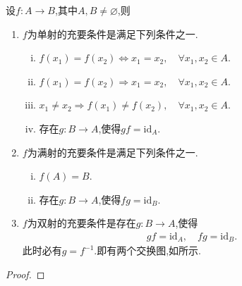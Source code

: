 \documentclass[../../main.tex]{subfiles}%
\begin{document}
\begin{theorem}
设$f:A\to B$,其中$A,B\neq \varnothing$,则
\begin{enumerate}[(1)]
\item $f$为单射的充要条件是满足下列条件之一.
\begin{enumerate}[(i)]
\item $f(x_1)=f(x_2)\iff x_1=x_2,\quad \forall x_1,x_2\in A.$

\item $f(x_1)=f(x_2)\Longrightarrow x_1=x_2,\quad \forall x_1,x_2\in A.$

\item $x_1\ne x_2\Longrightarrow f(x_1)\ne f(x_2),\quad \forall x_1,x_2\in A.$

\item 存在$g:B\to A$,使得$gf=\text{id}_A.$
\end{enumerate}

\item $f$为满射的充要条件是满足下列条件之一.
\begin{enumerate}[(i)]
\item $f(A)=B.$

\item 存在$g:B\to A$,使得$fg=\text{id}_B.$
\end{enumerate}

\item $f$为双射的充要条件是存在$g:B\to A$,使得
\begin{align*}
gf=\text{id}_A,\quad fg=\text{id}_B.
\end{align*}
此时必有$g=f^{-1}$.即有两个交换图,如所示.
\end{enumerate}
\end{theorem}
\begin{note}
\begin{figure}[H]
\centering
\caption{}
\label{figure:交换图fiou3nr4-1}
\end{figure}
\end{note}
\begin{proof}



\end{proof}
\end{document}
